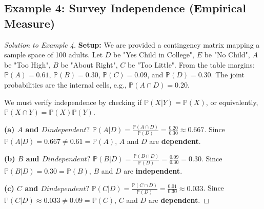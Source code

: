 \documentclass[12pt, a4paper]{article}
\theoremstyle{definition}
\theoremstyle{remark}
\newcommand{\Prob}{\mathbb{P}}
\newcommand{\1}{\mathbf{1}}
\begin{document}
\subsection*{Example 4: Survey Independence (Empirical Measure)}
\begin{proof}[Solution to Example 4]
\textbf{Setup:} We are provided a contingency matrix mapping a sample space of 100 adults. Let $D$ be "Yes Child in College", $E$ be "No Child", $A$ be "Too High", $B$ be "About Right", $C$ be "Too Little". From the table margins:
$\Prob(A) = 0.61$, $\Prob(B) = 0.30$, $\Prob(C) = 0.09$, and $\Prob(D) = 0.30$. 
The joint probabilities are the internal cells, e.g., $\Prob(A \cap D) = 0.20$.

We must verify independence by checking if $\Prob(X | Y) = \Prob(X)$, or equivalently, $\Prob(X \cap Y) = \Prob(X)\Prob(Y)$.

\textbf{(a) $A$ and $D independent?$}
$\Prob(A|D) = \frac{\Prob(A \cap D)}{\Prob(D)} = \frac{0.20}{0.30} \approx 0.667$.
Since $\Prob(A|D) = 0.667 \neq 0.61 = \Prob(A)$, $A$ and $D$ are \textbf{dependent}.

\textbf{(b) $B$ and $D independent?$}
$\Prob(B|D) = \frac{\Prob(B \cap D)}{\Prob(D)} = \frac{0.09}{0.30} = 0.30$.
Since $\Prob(B|D) = 0.30 = \Prob(B)$, $B$ and $D$ are \textbf{independent}.

\textbf{(c) $C$ and $D independent?$}
$\Prob(C|D) = \frac{\Prob(C \cap D)}{\Prob(D)} = \frac{0.01}{0.30} \approx 0.033$.
Since $\Prob(C|D) \approx 0.033 \neq 0.09 = \Prob(C)$, $C$ and $D$ are \textbf{dependent}.
\end{proof}

\end{document}
